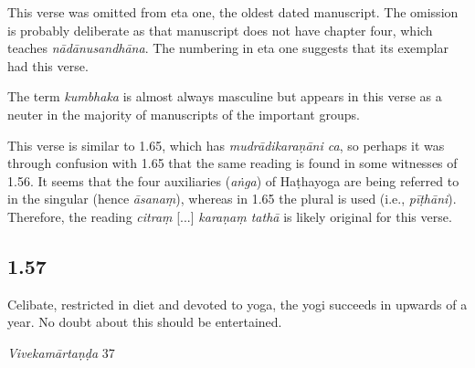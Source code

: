 \begin{ekdosis}
\begin{testimonia}[hp01_056]
\end{testimonia}

\begin{philcomm}[hp01_056]
This verse was omitted from eta one, the oldest dated manuscript. The omission is probably deliberate as that manuscript does not have chapter four, which teaches \emph{nādānusandhāna}. The numbering in eta one suggests that its exemplar had this verse.

The term \emph{kumbhaka} is almost always masculine but appears in this verse as a neuter in the majority of manuscripts of the important groups.


This verse is similar to 1.65, which has \emph{mudrādikaraṇāni ca}, so perhaps it was through confusion with 1.65 that the same reading is found in some witnesses of 1.56. It seems that the four auxiliaries (\emph{aṅga}) of Haṭhayoga are being referred to in the singular (hence \emph{āsanaṃ}), whereas in 1.65 the plural is used (i.e., \emph{pīṭhāni}). Therefore, the reading \emph{citraṃ} [...] \emph{karaṇaṃ tathā} is likely original for this verse.

%
\end{philcomm}

\subsection*{1.57}
\begin{translation}[hp01_057]
Celibate, restricted in diet and devoted to yoga, the yogi succeeds in upwards of a year. No doubt about this should be entertained.
\end{translation}

\begin{sources}[hp01_057]
\emph{Vivekamārtaṇḍa} 37

\begin{versinnote}
\end{versinnote}


\end{sources}
\end{ekdosis}
